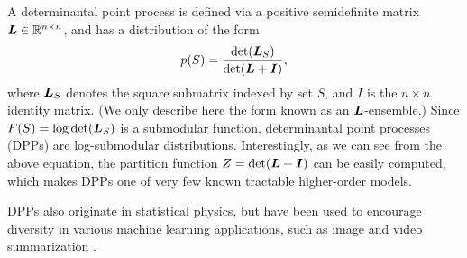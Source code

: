 \begin{example}
A determinantal point process \citep{lyons03,kulesza12} is defined via a positive semidefinite matrix $\bm{L} \in \mathbb{R}^{n \times n}$, and has a distribution of the form
\begin{align*}
p(S) = \frac{\det(\bm{L}_S)}{\det(\bm{L} + \bm{I})},
\end{align*}
where $\bm{L}_S$ denotes the square submatrix indexed by set $S$, and $I$ is the $n \times n$ identity matrix.
(We only describe here the form known as an $\bm{L}$-ensemble.)
Since $F(S) = \log \det(\bm{L}_S)$ is a submodular function, determinantal point processes (DPPs) are log-submodular distributions.
Interestingly, as we can see from the above equation, the partition function $Z = \det(\bm{L} + \bm{I})$ can be easily computed, which makes DPPs one of very few known tractable higher-order models.

DPPs also originate in statistical physics, but have been used to encourage diversity in various machine learning applications, such as image and video summarization \citep{kulesza12,gong14}.
\end{example}

